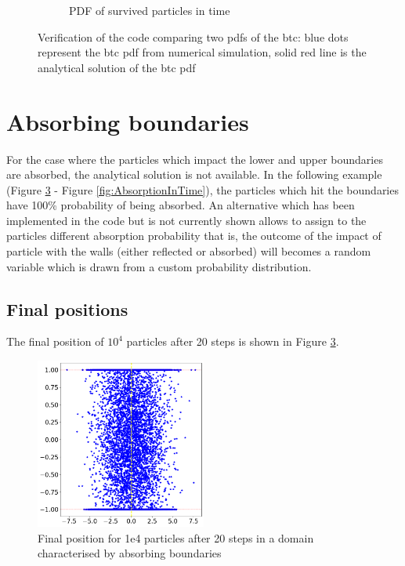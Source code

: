 \documentclass{article}
\begin{document}
\begin{figure}[htbp]
\begin{subfigure}[b]{0.45\textwidth}
        \caption{PDF of survived particles in time}
        \label{fig:subplotLivePart}
    \end{subfigure}
    \caption{Verification of the code comparing two pdfs of the btc: blue dots represent the btc pdf from numerical simulation, solid red line is the analytical solution of the btc pdf}
    \label{fig:Degradation}
\end{figure}

\FloatBarrier  %
\section{Absorbing boundaries}
For the case where the particles which impact the lower and upper boundaries are absorbed, the analytical solution is not available. In the following example (Figure \ref{fig:finalPos} - Figure \ref{fig:AbsorptionInTime}), the particles which hit the boundaries have 100\% probability of being absorbed. An alternative which has been implemented in the code but is not currently shown allows to assign to the particles different absorption probability that is, the outcome of the impact of particle with the walls (either reflected or absorbed) will becomes a random variable which is drawn from a custom probability distribution.

\FloatBarrier  %
\subsection{Final positions}
The final position of $10^4$ particles after 20 steps is shown in Figure \ref{fig:finalPos}.
\begin{figure}[htbp]
    \centering
    \includegraphics[width=0.5\textwidth]{images/finalPositions.png}
    \caption{Final position for 1e4 particles after 20 steps in a domain characterised by absorbing boundaries}
    \label{fig:finalPos}
\end{figure}
\end{document}
